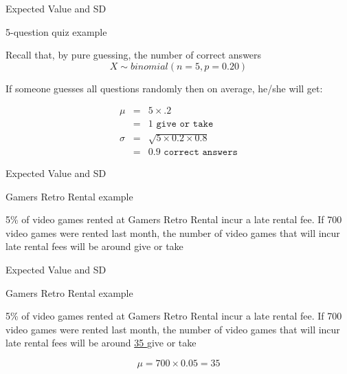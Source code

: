 \documentclass[14pt]{beamer}\usepackage[]{graphicx}\usepackage[]{color}
\begin{document}
\begin{frame}[fragile]{Expected Value and SD}

\vspace{-1cm}

\begin{center}{\tiny{5-question quiz example}} \end{center}

Recall that, by pure guessing, the number of correct answers 
$$ X \sim binomial(n = 5, p = 0.20)$$

If someone guesses all questions randomly then on average, he/she will get:

\vspace{-1cm}

\begin{eqnarray*}
\mu &=& 5 \times .2 \\
 &=& 1 \texttt{ give or take } \\
 \sigma &=& \sqrt{5 \times 0.2 \times 0.8 } \\
 &=& 0.9 \texttt{ correct answers}
\end{eqnarray*}

\end{frame}

\begin{frame}[fragile]{Expected Value and SD}

\vspace{-1cm}

\begin{center}{\tiny{Gamers Retro Rental example}} \end{center}

5\% of video games rented at Gamers Retro Rental incur a late rental fee.  If 700 video games were rented last month, the number of video games that will incur late rental fees will be around
\underline{\phantom{xxxxxxxxxx}} give or take \underline{\phantom{xxxxxxxxxx}}

\end{frame}

\begin{frame}[fragile]{Expected Value and SD}

\vspace{-1cm}

\begin{center}{\tiny{Gamers Retro Rental example}} \end{center}

5\% of video games rented at Gamers Retro Rental incur a late rental fee. If 700 video games were rented last month, the number of video games that will incur late rental fees will be around
\underline{   35   } give or take \underline{\phantom{xxxxxxxxxx}}
  
$$ \mu = 700 \times 0.05 = 35 $$  

\end{frame}
\end{document}
